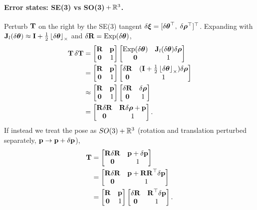 \paragraph{Error states: SE(3) vs SO(3)\,$+\,\Reals^3$.} Perturb $\vect{T}$ on the right by the SE(3) tangent $\delta\vect{\xi} = [\delta\vect{\theta}\trans,\;\delta\vect{\rho}\trans]\trans$. Expanding with $\vect{J}_l(\delta\vect{\theta})\approx\vect{I}+\tfrac12\skewsym{\delta\vect{\theta}}$ and $\delta\vect{R} = \Exp(\delta\vect{\theta})$,
\begin{align}
\vect{T}\,\delta\vect{T}
&= \begin{bmatrix}\vect{R}&\vect{p}\\\vect{0}&1\end{bmatrix}\begin{bmatrix}\Exp(\delta\vect{\theta}) & \vect{J}_l(\delta\vect{\theta})\delta\vect{\rho}\\\vect{0}&1\end{bmatrix} \\
&= \begin{bmatrix}\vect{R}&\vect{p}\\\vect{0}&1\end{bmatrix}\begin{bmatrix}\delta\vect{R} & (\vect{I}+\tfrac12\skewsym{\delta\vect{\theta}})\delta\vect{\rho}\\\vect{0}&1\end{bmatrix} \\
&\approx \begin{bmatrix}\vect{R}&\vect{p}\\\vect{0}&1\end{bmatrix}\begin{bmatrix}\delta\vect{R} & \delta\vect{\rho}\\\vect{0}&1\end{bmatrix} \\
&= \begin{bmatrix}\vect{R}\delta\vect{R} & \vect{R}\delta\vect{\rho}+\vect{p}\\ \vect{0}&1\end{bmatrix}.
\end{align}
If instead we treat the pose as $SO(3)+\Reals^3$ (rotation and translation perturbed separately, $\vect{p}\to\vect{p}+\delta\vect{p}$),
\begin{align}
\vect{T} &= \begin{bmatrix}\vect{R}\delta\vect{R} & \vect{p}+\delta\vect{p}\\\vect{0}&1\end{bmatrix} \\
&= \begin{bmatrix}\vect{R}\delta\vect{R} & \vect{p}+\vect{R}\vect{R}\trans\delta\vect{p}\\\vect{0}&1\end{bmatrix} \\
&= \begin{bmatrix}\vect{R}&\vect{p}\\\vect{0}&1\end{bmatrix}\begin{bmatrix}\delta\vect{R} & \vect{R}\trans\delta\vect{p}\\\vect{0}&1\end{bmatrix}.
\end{align}
